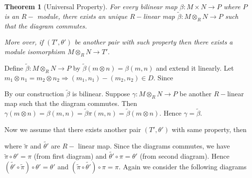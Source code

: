 \documentclass[11pt]{amsart}
\newtheorem{theorem}{Theorem}[section]
\begin{document}
\begin{theorem}[Universal Property]
For every bilinear map $\beta:M\times N\to P$ where $P$ is an $R-$ module, there exists an unique $R-$linear map $\tilde{\beta}:M\otimes_R N\to P$ such that the diagram commutes.

\begin{center}
\end{center}


 More over, if $(T',\theta')$ be another pair with such property then there exists a module isomorphism $M\otimes_RN\to T'.$
\end{theorem}

\proof Define $\tilde{\beta}:M\otimes_RN\to P$ by $\tilde{\beta}(m\otimes n)=\beta(m,n)$ and extend it linearly. Let $m_1\otimes n_1=m_2\otimes n_2 \Rightarrow (m_1,n_1)-(m_2,n_2)\in D.$ Since 

 
 By our construction $\tilde{\beta}$ is bilinear. Suppose $\gamma:M\otimes_RN\to P$ be another $R-$linear map such that the diagram commutes. Then $\gamma(m\otimes n)=\beta(m,n)=\tilde{\beta}\pi(m,n)=\tilde{\beta}(m\otimes n).$ Hence $\gamma=\tilde{\beta}.$
 
  Now we assume that there exists another pair $(T',\theta')$ with same property, then

\begin{center}
\end{center}

where $\tilde{\pi}$ and $\tilde{\theta'}$ are $R-$ linear map. Since the diagrams commutes, we have $\tilde{\pi}\circ \theta'=\pi$ (from first diagram) and $\tilde{\theta'}\circ \pi=\theta'$ (from second diagram). Hence $(\tilde{\theta'}\circ \tilde{\pi})\circ \theta'=\theta'$ and $(\tilde{\pi}\circ\tilde{\theta'})\circ \pi=\pi.$ Again we consider the following diagrams 
\end{document}
